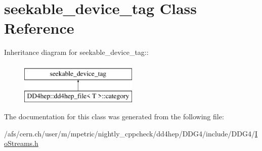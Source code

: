 \hypertarget{classboost_1_1iostreams_1_1seekable__device__tag}{
\section{seekable\_\-device\_\-tag Class Reference}
\label{classboost_1_1iostreams_1_1seekable__device__tag}
}
Inheritance diagram for seekable\_\-device\_\-tag::\begin{figure}[H]
\begin{center}
\leavevmode
\includegraphics[height=2cm]{classboost_1_1iostreams_1_1seekable__device__tag}
\end{center}
\end{figure}


The documentation for this class was generated from the following file:\begin{DoxyCompactItemize}
\item 
/afs/cern.ch/user/m/mpetric/nightly\_\-cppcheck/dd4hep/DDG4/include/DDG4/\hyperlink{_io_streams_8h}{IoStreams.h}\end{DoxyCompactItemize}
